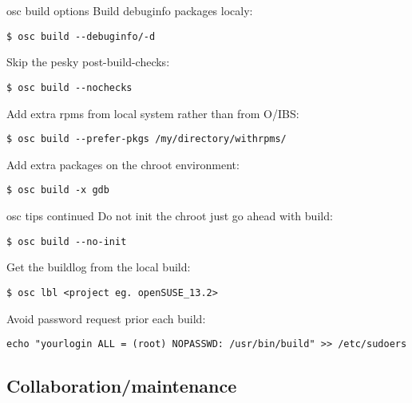 \documentclass{beamer}
\begin{document}
\begin{frame}[fragile]{osc build options}
Build debuginfo packages localy:
\begin{small}
\begin{verbatim}$ osc build --debuginfo/-d\end{verbatim}
\end{small}
Skip the pesky post-build-checks:
\begin{small}
\begin{verbatim}$ osc build --nochecks\end{verbatim}
\end{small}
Add extra rpms from local system rather than from O/IBS:
\begin{small}
\begin{verbatim}$ osc build --prefer-pkgs /my/directory/withrpms/\end{verbatim}
\end{small}
Add extra packages on the chroot environment:
\begin{small}
\begin{verbatim}$ osc build -x gdb\end{verbatim}
\end{small}
\end{frame}

\begin{frame}[fragile]{osc tips continued}
Do not init the chroot just go ahead with build:
\begin{small}
\begin{verbatim}$ osc build --no-init\end{verbatim}
\end{small}
Get the buildlog from the local build:
\begin{small}
\begin{verbatim}$ osc lbl <project eg. openSUSE_13.2>\end{verbatim}
\end{small}
Avoid password request prior each build:
\begin{tiny}
\begin{verbatim}echo "yourlogin ALL = (root) NOPASSWD: /usr/bin/build" >> /etc/sudoers\end{verbatim}
\end{tiny}
\end{frame}

\subsection{Collaboration/maintenance}
\end{document}
